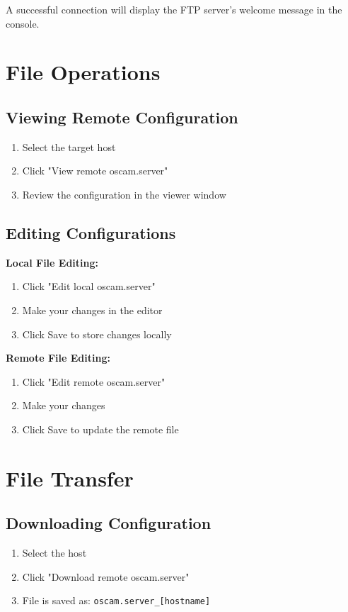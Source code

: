 \documentclass[a4paper,11pt]{report}
\begin{document}
\begin{notebox}
A successful connection will display the FTP server's welcome message in the console.
\end{notebox}

\section{File Operations}

\subsection{Viewing Remote Configuration}
\begin{procedurebox}
\begin{enumerate}
    \item Select the target host
    \item Click "View remote oscam.server"
    \item Review the configuration in the viewer window
\end{enumerate}
\end{procedurebox}

\subsection{Editing Configurations}
\begin{procedurebox}
\textbf{Local File Editing:}
\begin{enumerate}
    \item Click "Edit local oscam.server"
    \item Make your changes in the editor
    \item Click Save to store changes locally
\end{enumerate}

\textbf{Remote File Editing:}
\begin{enumerate}
    \item Click "Edit remote oscam.server"
    \item Make your changes
    \item Click Save to update the remote file
\end{enumerate}
\end{procedurebox}

\section{File Transfer}

\subsection{Downloading Configuration}
\begin{procedurebox}
\begin{enumerate}
    \item Select the host
    \item Click "Download remote oscam.server"
    \item File is saved as: \texttt{oscam.server\_[hostname]}
\end{enumerate}
\end{procedurebox}
\end{document}
